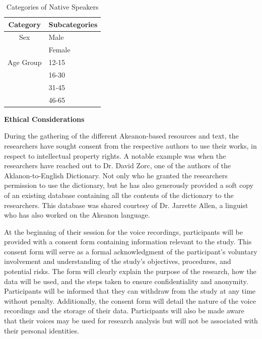 \begin{table}[ht]
   \centering
   \caption{Categories of Native Speakers} \vspace{0.25em}
   \label{tab:native_speakers}
   \renewcommand{\arraystretch}{1.5} %
   \setlength{\tabcolsep}{10pt} %

\begin{tabular}{|c|p{2in}|} \hline
   \centering Category & Subcategories \\ \hline
   Sex & Male \\ 
   & Female \\ 
   \hline
   Age Group & 12-15 \\ 
   & 16-30 \\ 
   & 31-45 \\ 
   & 46-65 \\ \hline
\end{tabular}
\end{table}

\textbf{Ethical Considerations}

During the gathering of the different Akeanon-based resources and text, the researchers have sought consent from the respective authors to use their works, in respect to intellectual property rights. A notable example was when the researchers have reached out to Dr. David Zorc, one of the authors of the Aklanon-to-English Dictionary. Not only who he granted the researchers permission to use the dictionary, but he has also generously provided a soft copy of an existing database containing all the contents of the dictionary to the researchers. This database was shared courtesy of Dr. Jarrette Allen, a linguist who has also worked on the Akeanon language.

At the beginning of their session for the voice recordings, participants will be provided with a consent form containing information relevant to the study. This consent form will serve as a formal acknowledgment of the participant's voluntary involvement and understanding of the study's objectives, procedures, and potential risks. The form will clearly explain the purpose of the research, how the data will be used, and the steps taken to ensure confidentiality and anonymity. Participants will be informed that they can withdraw from the study at any time without penalty. Additionally, the consent form will detail the nature of the voice recordings and the storage of their data. Participants will also be made aware that their voices may be used for research analysis but will not be associated with their personal identities.


